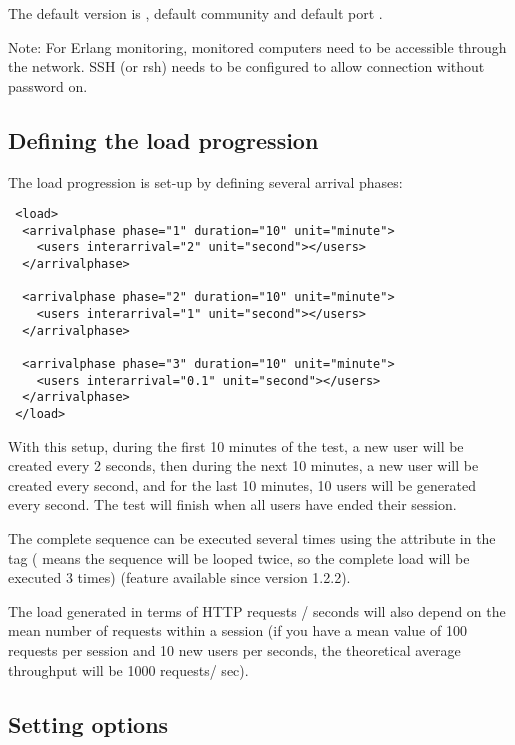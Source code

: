 \documentclass{IDXDOC-en}
\begin{document}
The default version is , default community
 and default port .




\par Note: For Erlang monitoring, monitored computers need to be
accessible through the network. SSH (or rsh) needs to be configured to
allow connection without password on. 

\subsection{Defining the load progression}

\par The load progression is set-up by defining several arrival phases:

\begin{Verbatim}
 <load>
  <arrivalphase phase="1" duration="10" unit="minute">
    <users interarrival="2" unit="second"></users>
  </arrivalphase>

  <arrivalphase phase="2" duration="10" unit="minute">
    <users interarrival="1" unit="second"></users>
  </arrivalphase>

  <arrivalphase phase="3" duration="10" unit="minute">
    <users interarrival="0.1" unit="second"></users>
  </arrivalphase>
 </load>
\end{Verbatim}

With this setup, during the first 10 minutes of the test, a new user
will be created every 2 seconds, then during the next 10 minutes, a
new user will be created every second, and for the last 10 minutes,
10 users will be generated every second. The test will finish when
all users have ended their session.

The complete sequence can be executed several times using the
 attribute in the  tag
( means the sequence will be looped twice, so the
complete load will be executed 3 times) (feature available since
version 1.2.2).

The load generated in terms of HTTP requests / seconds will also
depend on the mean number of requests within a session (if you have a
mean value of 100 requests per session and 10 new users per seconds,
the theoretical average throughput will be 1000 requests/ sec).

\subsection{Setting options}
\end{document}
